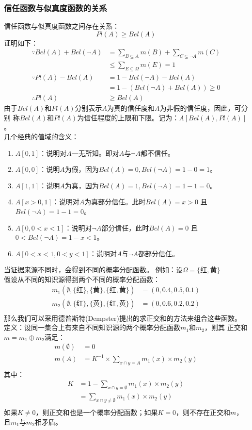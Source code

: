 \documentclass[12pt]{article}
\begin{document}
\subsubsection{信任函数与似真度函数的关系}
信任函数与似真度函数之间存在关系：
\[
	Pl(A)\geq Bel(A)
\]
证明如下：
\[
	\begin{aligned}
		\because Bel(A)+Bel(\neg A)&=\sum\limits_{B\subseteq A}m(B)
		+\sum\limits_{C\subseteq\neg A}m(C)\\
		&\leq\sum\limits_{E\subseteq\Omega}m(E)=1\\
		\because Pl(A)-Bel(A)&=1-Bel(\neg A)-Bel(A)\\
		&=1-(Bel(\neg A)+Bel(A))\geq 0\\
		\therefore Pl(A)&\geq Bel(A)
	\end{aligned}
\]
由于$Bel(A)$和$Pl(A)$分别表示$A$为真的信任度和$A$为非假的信任度，因此，可分别
称$Bel(A)$和$Pl(A)$为信任程度的上限和下限。记为：$A[Bel(A),Pl(A)]$。\\
几个经典的值域的含义：\\
\begin{enumerate}
	\item $A[0,1]$：说明对$A$一无所知。即对$A$与$\neg A$都不信任。
	\item $A[0,0]$：说明$A$为假，因为$Bel(A)=0,Bel(\neg A)=1-0=1$。
	\item $A[1,1]$：说明$A$为真，因为$Bel(A)=1,Bel(\neg A)=1-1=0$。
	\item $A[x>0,1]$：说明对$A$为真部分信任。此时$Bel(A)=x>0$
		且$Bel(\neg A)=1-1=0$。
	\item $A[0,0<x<1]$：说明对$\neg A$部分信任，此时$Bel(A)=0$
		且$0<Bel(\neg A)=1-x<1$。
	\item $A[0<x<1,0<y<1]$：说明对$A$与$\neg A$都部分信任。
\end{enumerate}
当证据来源不同时，会得到不同的概率分配函数。
例如：设$\Omega=\{红,黄\}$\\
假设从不同的知识源得到两个不同的概率分配函数：
\[
	\begin{aligned}
		m_1(\emptyset,\{红\},\{黄\},\{红,黄\})&=(0,0.4,0.5,0.1)\\
		m_2(\emptyset,\{红\},\{黄\},\{红,黄\})&=(0,0.6,0.2,0.2)\\
	\end{aligned}
\]
那么我们可以采用德普斯特(Dempster)提出的求正交和的方法来组合这些函数。\\
定义：设同一集合上有来自不同知识源的两个概率分配函数$m_1$和$m_2$，则其
正交和$m=m_1\oplus m_2$满足：
\[
	\begin{aligned}
		m(\emptyset)&=0\\
		m(A)&=K^{-1}\times\sum\limits_{x\cap y=A}m_1(x)\times m_2(y)\\
	\end{aligned}
\]
其中：
\[
	\begin{aligned}
		K&=1-\sum\limits_{x\cap y=\emptyset}m_1(x)\times m_2(y)\\
		 &=\sum\limits_{x\cap y\neq\emptyset}m_1(x)\times m_2(y)\\
	\end{aligned}
\]
如果$K\neq 0$，则正交和也是一个概率分配函数；如果$K=0$，则不存在正交和$m$，
且$m_1$与$m_2$相矛盾。\\
\end{document}
